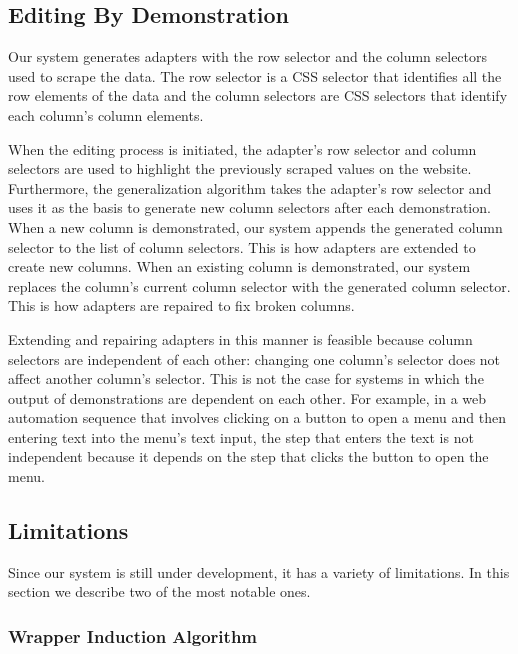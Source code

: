 \documentclass[sigconf,10pt]{acmart}
\begin{document}
\hypertarget{editing-by-demonstration}{%
\subsection{Editing By Demonstration}\label{editing-by-demonstration}}

Our system generates adapters with the row selector and the column
selectors used to scrape the data. The row selector is a CSS selector
that identifies all the row elements of the data and the column
selectors are CSS selectors that identify each column's column elements.

When the editing process is initiated, the adapter's row selector and
column selectors are used to highlight the previously scraped values on
the website. Furthermore, the generalization algorithm takes the
adapter's row selector and uses it as the basis to generate new column
selectors after each demonstration. When a new column is demonstrated,
our system appends the generated column selector to the list of column
selectors. This is how adapters are extended to create new columns. When
an existing column is demonstrated, our system replaces the column's
current column selector with the generated column selector. This is how
adapters are repaired to fix broken columns.

Extending and repairing adapters in this manner is feasible because
column selectors are independent of each other: changing one column's
selector does not affect another column's selector. This is not the case
for systems in which the output of demonstrations are dependent on each
other. For example, in a web automation sequence that involves clicking
on a button to open a menu and then entering text into the menu's text
input, the step that enters the text is not independent because it
depends on the step that clicks the button to open the menu.

\hypertarget{limitations}{%
\subsection{Limitations}\label{limitations}}

Since our system is still under development, it has a variety of
limitations. In this section we describe two of the most notable ones.

\hypertarget{wrapper-induction-algorithm-1}{%
\subsubsection{Wrapper Induction
Algorithm}\label{wrapper-induction-algorithm-1}}
\end{document}
